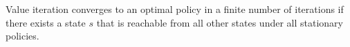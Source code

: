 Value iteration converges to an optimal policy in a finite number of iterations \cite{puterman_chapter_1990} if there exists a state $s$ that is reachable from all other states under all stationary policies.


